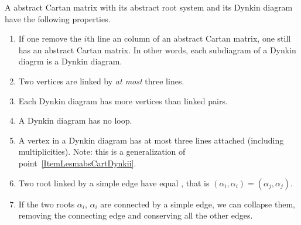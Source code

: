 \begin{lemma}   \label{LesmabsCartDynk}
	A abstract Cartan matrix with its abstract root system and its Dynkin diagram have the following properties.
	\begin{enumerate}
		\item\label{ItemLesmabsCartDynki}
		If one remove the \( i\)th line an column of an abstract Cartan matrix, one still has an abstract Cartan matrix. In other words, each subdiagram of a Dynkin diagrm is a Dynkin diagram.
		\item\label{ItemLesmabsCartDynkii}
		Two vertices are linked by \emph{at most} three lines.
		\item\label{ItemLesmabsCartDynkiii}
		Each Dynkin diagram has more vertices than linked pairs.
		\item\label{ItemLesmabsCartDynkiv}
		A Dynkin diagram has no loop.
		\item\label{ItemLesmabsCartDynkv}
		A vertex in a Dynkin diagram has at most three lines attached (including multiplicities). Note: this is a generalization of point~\ref{ItemLesmabsCartDynkii}.
		\item\label{ItemLesmabsCartDynkvi}
		Two root linked by a simple edge have equal , that is \( (\alpha_i,\alpha_i)=(\alpha_j,\alpha_j)\).
		\item\label{ItemLesmabsCartDynkvii}
		If the two roots \( \alpha_i\), \( \alpha_i\) are connected by a simple edge, we can collapse them, removing the connecting edge and conserving all the other edges.

	\end{enumerate}
\end{lemma}

